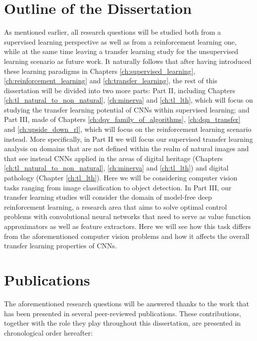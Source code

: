 \section{Outline of the Dissertation}


As mentioned earlier, all research questions will be studied both from a supervised learning perspective as well as from a reinforcement learning one, while at the same time leaving a transfer learning study for the unsupervised learning scenario as future work. It naturally follows that after having introduced these learning paradigms in Chapters \ref{ch:supervised_learning}, \ref{ch:reinforcement_learning} and \ref{ch:transfer_learning}, the rest of this dissertation will be divided into two more parts: Part II, including Chapters \ref{ch:tl_natural_to_non_natural}, \ref{ch:minerva} and \ref{ch:tl_lth}, which will focus on studying the transfer learning potential of CNNs within supervised learning; and Part III, made of Chapters \ref{ch:dqv_family_of_algorithms}, \ref{ch:dqn_transfer} and \ref{ch:upside_down_rl}, which will focus on the reinforcement learning scenario instead. More specifically, in Part II we will focus our supervised transfer learning analysis on domains that are not defined within the realm of natural images and that see instead CNNs applied in the areas of digital heritage (Chapters \ref{ch:tl_natural_to_non_natural}, \ref{ch:minerva} and \ref{ch:tl_lth}) and digital pathology (Chapter \ref{ch:tl_lth}). Here we will be considering computer vision tasks ranging from image classification to object detection. In Part III, our transfer learning studies will consider the domain of model-free deep reinforcement learning, a research area that aims to solve optimal control problems with convolutional neural networks that need to serve as value function approximators as well as feature extractors. Here we will see how this task differs from the aforementioned computer vision problems and how it affects the overall transfer learning properties of CNNs. 


\section{Publications}

The aforementioned research questions will be answered thanks to the work that has been presented in several peer-reviewed publications. These contributions, together with the role they play throughout this dissertation, are presented in chronological order hereafter:

